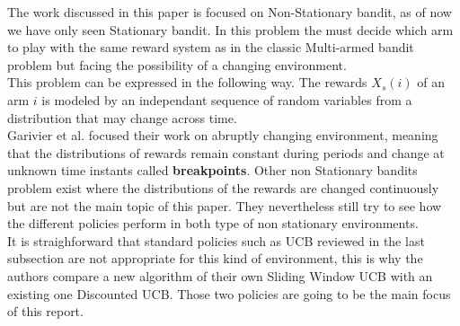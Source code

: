 The work discussed in this paper is focused on Non-Stationary bandit, as of now we have only seen Stationary bandit. In this problem the must decide which arm to play with the same reward system as in the classic Multi-armed bandit problem but facing the possibility of a changing environment.\\

This problem can be expressed in the following way. The rewards $X_s(i)$ of an arm $i$ is modeled by an independant sequence of random variables from a distribution that may change across time.\\

Garivier et al. focused their work on abruptly changing environment, meaning that the distributions of rewards remain constant during periods and change at unknown time instants called \textbf{breakpoints}. Other non Stationary bandits problem exist where the distributions of the rewards are changed continuously but are not the main topic of this paper. They nevertheless still try to see how the different policies perform in both type of non stationary environments.\\

It is straighforward that standard policies such as UCB reviewed in the last subsection are not appropriate for this kind of environment, this is why the authors compare a new algorithm of their own Sliding Window UCB with an existing one Discounted UCB. Those two policies are going to be the main focus of this report.